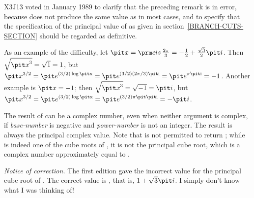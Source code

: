 \begin{defun}[Function]
\begin{new}
X3J13 voted in January 1989
to clarify that the preceding remark is in
error, because  does not produce the same value
as  in most cases, and to specify that the
specification of the principal value of  as given in section~\ref{BRANCH-CUTS-SECTION}
should be regarded as definitive.

As an example of the difficulty, let
$ {\it x}=\cis {2 \pi \over 3}= -{1 \over 2} + {\sqrt{3} \over 2}{\it i} $.
Then $ \sqrt{{\it x}^3} = \sqrt{1} = 1 $, but
$ {\it x}^{3 / 2} = {\it e}^{(3/2) \log {\hbox{\scriptsize\it x}}}
   = {\it e}^{(3/2) (2\pi/3) \hbox{\scriptsize\it i}} = {\it e}^{\pi \hbox{\scriptsize\it i}} = -1 $.
Another example is ${\it x}=-1$; then $ \sqrt{{\it x}^3} = \sqrt{-1} = {\it i} $, but
$ {\it x}^{3/2} = {\it e}^{(3 / 2) \log {\hbox{\scriptsize\it x}}}
   = {\it e}^{(3/2) \pi \hbox{\scriptsize\it \hbox{\scriptsize\it i}}} = -{\it i} $.
\end{new}

The result of  can be a complex number, even when neither argument
is complex, if {\it base-number} is negative and {\it power-number}
is not an integer.  The result is always the principal complex value.
Note that  is not permitted to return ;
while  is indeed one of the cube roots of , it is
not the principal cube root, which is a complex number
approximately equal to .

\begin{new}%
{\it Notice of correction.}  The first edition gave the incorrect value
 for the principal cube root of .  The correct
value is , that is, $1+\sqrt{3}{\it i}$.  I simply don't know what
I was thinking of!
\end{new}
\end{defun}


